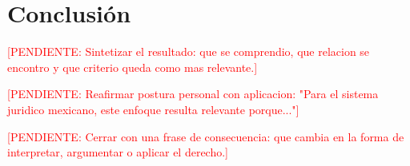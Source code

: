 \documentclass[
	spanish,
	letterpaper, oneside
]{article}
\newcommand{\pendiente}[1]{\textcolor{red}{[PENDIENTE: #1]}}
\begin{document}
\section{Conclusión}

\pendiente{Sintetizar el resultado: que se comprendio, que relacion se encontro y que criterio queda como mas relevante.}

\pendiente{Reafirmar postura personal con aplicacion: "Para el sistema juridico mexicano, este enfoque resulta relevante porque..."}

\pendiente{Cerrar con una frase de consecuencia: que cambia en la forma de interpretar, argumentar o aplicar el derecho.}





\end{document}
